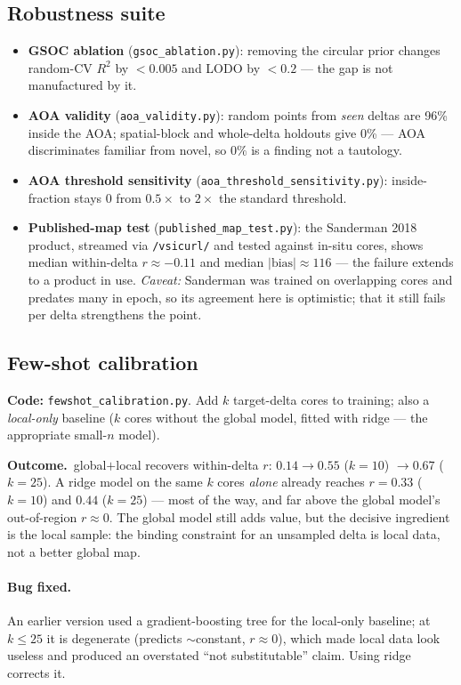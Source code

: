 \documentclass[11pt]{article}
\newcommand{\file}[1]{\texttt{\small #1}}
\newcommand{\out}{\textbf{\color{nb}Outcome.}\ }
\begin{document}
\subsection{Robustness suite}
\begin{itemize}
  \item \textbf{GSOC ablation} (\file{gsoc\_ablation.py}): removing the circular prior changes
  random-CV $R^2$ by $<0.005$ and LODO by $<0.2$ --- the gap is not manufactured by it.
  \item \textbf{AOA validity} (\file{aoa\_validity.py}): random points from \emph{seen} deltas
  are 96\% inside the AOA; spatial-block and whole-delta holdouts give 0\% --- AOA discriminates
  familiar from novel, so $0\%$ is a finding not a tautology.
  \item \textbf{AOA threshold sensitivity} (\file{aoa\_threshold\_sensitivity.py}): inside-fraction
  stays 0 from $0.5\times$ to $2\times$ the standard threshold.
  \item \textbf{Published-map test} (\file{published\_map\_test.py}): the Sanderman 2018 product,
  streamed via \texttt{/vsicurl/} and tested against in-situ cores, shows median within-delta
  $r\approx-0.11$ and median $|\text{bias}|\approx116$ --- the failure extends to a product in use.
  \emph{Caveat:} Sanderman was trained on overlapping cores and predates many in epoch, so its
  agreement here is optimistic; that it still fails per delta strengthens the point.
\end{itemize}

\subsection{Few-shot calibration}
\textbf{Code:} \file{fewshot\_calibration.py}. Add $k$ target-delta cores to training; also a
\emph{local-only} baseline ($k$ cores without the global model, fitted with ridge --- the
appropriate small-$n$ model).

\out global$+$local recovers within-delta $r$: $0.14\to0.55$ ($k{=}10$) $\to0.67$ ($k{=}25$).
A ridge model on the same $k$ cores \emph{alone} already reaches $r=0.33$ ($k{=}10$) and
$0.44$ ($k{=}25$) --- most of the way, and far above the global model's out-of-region
$r\approx0$. The global model still adds value, but the decisive ingredient is the local
sample: the binding constraint for an unsampled delta is local data, not a better global map.

\paragraph{Bug fixed.} An earlier version used a gradient-boosting tree for the local-only
baseline; at $k\leq25$ it is degenerate (predicts $\sim$constant, $r\approx0$), which made
local data look useless and produced an overstated ``not substitutable'' claim. Using ridge
corrects it.
\end{document}
